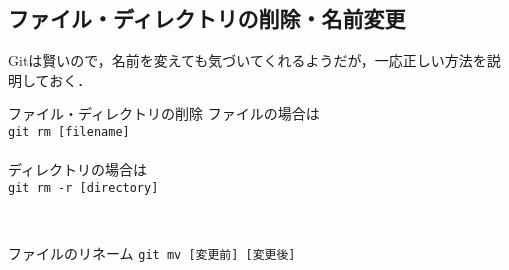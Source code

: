 \documentclass{jarticle}
\begin{document}
\subsection{ファイル・ディレクトリの削除・名前変更}
Gitは賢いので，名前を変えても気づいてくれるようだが，一応正しい方法を説明しておく．\\
\begin{itembox}[l]{ファイル・ディレクトリの削除}
ファイルの場合は\\
{\tt git rm [filename]}\\
\\
ディレクトリの場合は\\
{\tt git rm -r [directory]}\\
\end{itembox}
\\
\begin{itembox}[l]{ファイルのリネーム}
{\tt git mv [変更前] [変更後]}
\end{itembox}
\end{document}
